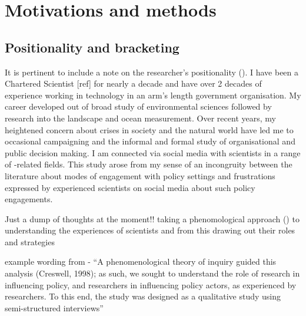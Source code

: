 \chapter{Motivations and methods}\label{ch:methods}


\section{Positionality and bracketing}\label{sec:metpositionality}

It is pertinent  to include a note on the researcher's positionality (\cite{CreswellP2017}). I have been a Chartered Scientist [ref] for nearly a decade and have over 2 decades of experience working in technology in an arm's length government organisation. My career developed out of broad study of environmental sciences followed by research into the landscape and ocean measurement. Over recent years, my heightened concern about crises in society and the natural world have led me to occasional campaigning and the informal and formal study of organisational and public decision making. I am connected via social media with scientists in a range of \CAN-related fields. This study arose from my sense of an incongruity between the literature about modes of engagement with policy settings and frustrations expressed by experienced scientists on social media about such policy engagements.



Just a dump of thoughts at the moment!!
taking a phenomological approach (\cite{CreswellP2017}) to understanding the experiences of scientists and from this drawing out their roles and strategies

example wording from \cite{KothariME2009} - ``A phenomenological theory of inquiry guided this analysis (Creswell, 1998); as such, we sought to understand the role of research in influencing policy, and researchers in influencing policy actors, as experienced by researchers. To this end, the study was designed as a qualitative study using semi-structured interviews''

